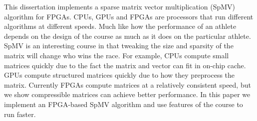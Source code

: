 This dissertation implements a sparse matrix vector multiplication (SpMV) algorithm for FPGAs. CPUs, GPUs and FPGAs are processors that run different algorithms at different speeds. Much like how the performance of an athlete depends on the design of the course as much as it does on the particular athlete. SpMV is an interesting course in that tweaking the size and sparsity of the matrix will change who wins the race. For example, CPUs compute small matrices quickly due to the fact the matrix and vector can fit in on-chip cache. GPUs compute structured matrices quickly due to how they preprocess the matrix. Currently FPGAs compute matrices at a relatively consistent speed, but we show compressible matrices can achieve better performance. In this paper we implement an FPGA-based SpMV algorithm and use features of the course to run faster.
